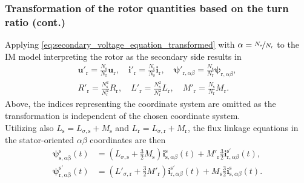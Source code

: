 \begin{frame}
	\frametitle{Transformation of the rotor quantities based on the turn ratio (cont.)}
    \onslide<+->
    Applying \eqref{eq:secondary_voltage_equation_transformed} with $\alpha=\nicefrac{N_\mathrm{s}}{N_\mathrm{r}}$ to the IM model  interpreting the rotor as the secondary side results in
    \begin{equation}
        \begin{gathered}
        \bm{u}'_{\mathrm{r}} = \frac{N_\mathrm{s}}{N_\mathrm{r}}\bm{u}_{\mathrm{r}}, \quad \bm{i}'_{\mathrm{r}} = \frac{N_\mathrm{r}}{N_\mathrm{s}}\bm{i}_{\mathrm{r}}, \quad \bm{\psi}'_{\mathrm{r},\alpha\beta} = \frac{N_\mathrm{s}}{N_\mathrm{r}}\bm{\psi}_{\mathrm{r},\alpha\beta},\\
        R'_\mathrm{r} =  \frac{N_\mathrm{s}^2}{N_\mathrm{r}^2} R_\mathrm{r}, \quad L'_\mathrm{r} =  \frac{N_\mathrm{s}^2}{N_\mathrm{r}^2} L_\mathrm{r}, \quad M'_\mathrm{r} =  \frac{N_\mathrm{s}}{N_\mathrm{r}} M_\mathrm{r}.
    \end{gathered}
    \end{equation}
    \onslide<+->
    Above, the indices representing the coordinate system are omitted as the transformation is independent of the chosen coordinate system. 
    \\[0.5em]
    \onslide<+->
    Utilizing also $L_\mathrm{s} = L_{\sigma,\mathrm{s}} + M_\mathrm{s}$ and $L_\mathrm{r} = L_{\sigma,\mathrm{r}} + M_\mathrm{r}$, the flux linkage equations in the stator-oriented $\alpha\beta$ coordinates are then
    \begin{align*}
        \bm{\psi}^\mathrm{s}_\mathrm{s,\alpha\beta}(t) &= (L_{\sigma,\mathrm{s}} +\frac{3}{2}M_\mathrm{s}) \bm{i}^\mathrm{s}_{\mathrm{s},\alpha\beta}(t) +  M'_{\mathrm{r}}\frac{3}{2} \bm{i}^{\mathrm{s}'}_{\mathrm{r},\alpha\beta}(t),\\
        \bm{\psi}^{\mathrm{s}'}_\mathrm{r,\alpha\beta}(t) &= (L'_{\sigma,\mathrm{r}} + \frac{3}{2}M'_\mathrm{r}) \bm{i}^{\mathrm{s}'}_{\mathrm{r},\alpha\beta}(t) +  M_{\mathrm{s}}\frac{3}{2} \bm{i}^\mathrm{s}_{\mathrm{s},\alpha\beta}(t).
    \end{align*}
\end{frame}

